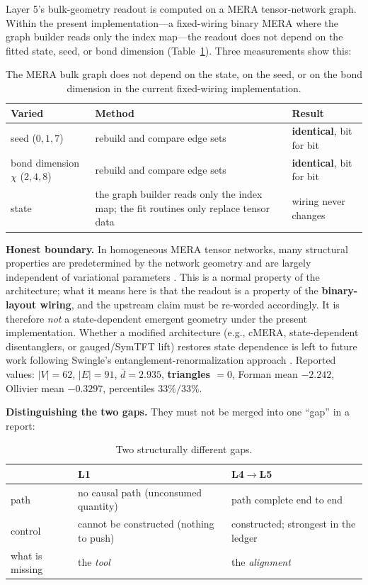 \documentclass[11pt,a4paper]{article}
\begin{document}
Layer 5's bulk-geometry readout is computed on a MERA tensor-network graph. Within
the present implementation---a fixed-wiring binary MERA where the graph builder
reads only the index map---the readout does not depend on the fitted state, seed,
or bond dimension (Table~\ref{tab:invariance}). Three measurements show this:

\begin{table}[h]
\centering\small
\begin{tabular}{@{}lll@{}}
\toprule
\textbf{Varied} & \textbf{Method} & \textbf{Result} \\
\midrule
seed ($0,1,7$)      & rebuild and compare edge sets & \textbf{identical}, bit for bit \\
bond dimension $\chi$ ($2,4,8$) & rebuild and compare edge sets & \textbf{identical}, bit for bit \\
state               & the graph builder reads only the index map;
                      the fit routines only replace tensor data & wiring never changes \\
\bottomrule
\end{tabular}
\caption{The MERA bulk graph does not depend on the state, on the seed, or on the
bond dimension in the current fixed-wiring implementation.}
\label{tab:invariance}
\end{table}

\noindent\textbf{Honest boundary.} In homogeneous MERA tensor networks, many
structural properties are predetermined by the network geometry and are largely
independent of variational parameters \cite{EvenblyVidal2011}. This is a normal
property of the architecture; what it means here is that the readout is a property
of the \textbf{binary-layout wiring}, and the upstream claim must be re-worded
accordingly. It is therefore \emph{not} a state-dependent emergent geometry under
the present implementation. Whether a modified architecture (e.g., cMERA,
state-dependent disentanglers, or gauged/SymTFT lift) restores state dependence is
left to future work following Swingle's entanglement-renormalization approach
\cite{Swingle2012}. Reported values: $|V| = 62$, $|E| = 91$, $\bar d = 2.935$,
\textbf{triangles $= 0$}, Forman mean $-2.242$, Ollivier mean $-0.3297$,
percentiles $33\%/33\%$.

\medskip
\noindent\textbf{Distinguishing the two gaps.} They must not be merged into one
``gap'' in a report:

\begin{table}[h]
\centering\small
\begin{tabular}{@{}lll@{}}
\toprule
 & \textbf{L1} & \textbf{L4$\to$L5} \\
\midrule
path      & no causal path (unconsumed quantity) & path complete end to end \\
control   & cannot be constructed (nothing to push) & constructed; strongest in the ledger \\
what is missing & the \emph{tool} & the \emph{alignment} \\
\bottomrule
\end{tabular}
\caption{Two structurally different gaps.}
\label{tab:gaps}
\end{table}
\end{document}
